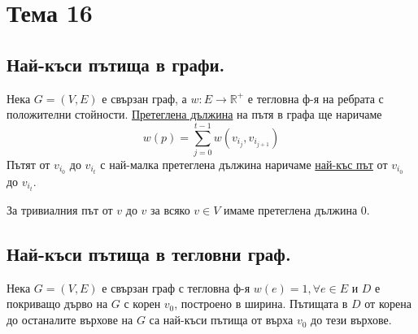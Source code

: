 \section{Тема 16}

\subsection{Най-къси пътища в графи.}

\begin{definition}
    Нека \(G = (V, E)\) е свързан граф, а \(w: E \to \mathbb{R}^+\) е тегловна ф-я на ребрата с 
    положителни стойности. \underline{Претеглена дължина} на пътя  
    в графа ще наричаме 
    \begin{equation*}
        w(p) = \sum_{j = 0}^{t - 1} w(v_{i_j}, v_{i_{j + 1}})
    \end{equation*}
    Пътят от \(v_{i_0}\) до \(v_{i_t}\) с най-малка претеглена дължина наричаме \underline{най-къс път}
    от \(v_{i_0}\) до \(v_{i_t}\).
\end{definition}

\begin{note}
    За тривиалния път от \(v\) до \(v\) за всяко \(v \in V\) имаме претеглена дължина 0.
\end{note}

\subsection{Най-къси пътища в тегловни граф.}

\begin{theorem}
    Нека \(G = (V, E)\) е свързан граф с тегловна ф-я \(w(e) = 1, \forall e \in E\) и \(D\) е покриващо 
    дърво на \(G\) с корен \(v_0\), построено в ширина. Пътищата в \(D\) от корена до останалите върхове 
    на \(G\) са най-къси пътища от върха \(v_0\) до тези върхове.
\end{theorem}

